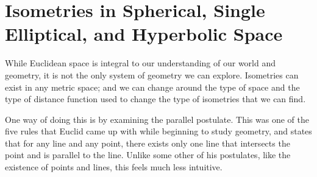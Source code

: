 \documentclass{mystyle}
\begin{document}
\section{Isometries in Spherical, Single Elliptical, and Hyperbolic Space}\label{sec_three}
While Euclidean space is integral to our understanding of our world and geometry, it is not the only system of geometry we can explore. Isometries can exist in any metric space; and we can change around the type of space and the type of distance function used to change the type of isometries that we can find. 

One way of doing this is by examining the parallel postulate. This was one of the five rules that Euclid came up with while beginning to study geometry, and states that for any line and any point, there exists only one line that intersects the point and is parallel to the line. Unlike some other of his postulates, like the existence of points and lines, this feels much less intuitive. 
\end{document}
